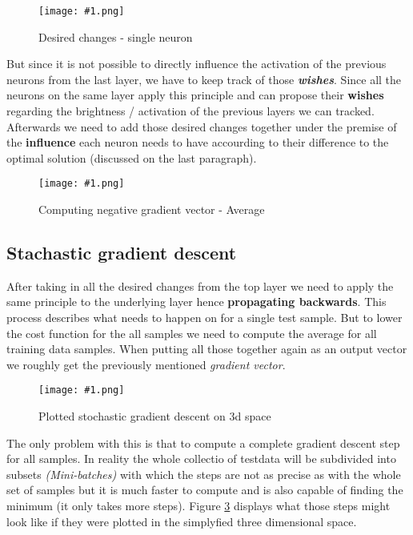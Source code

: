\documentclass{article}
\newcommand{\img}[1]{
	\centering
	\texttt{[image: \#1.png]}
	\label{#1}
}
\begin{document}
\begin{figure}[!htbp]
\img{ai_21}
\caption{Desired changes - single neuron}
\end{figure}

But since it is not possible to directly influence the activation of the previous neurons from the last layer, we have to keep track of those \textbf{\textit{wishes}}. Since all the neurons on the same layer apply this principle and can propose their \textbf{wishes} regarding the brightness / activation of the previous layers we can tracked. Afterwards we need to add those desired changes together under the premise of the \textbf{influence} each neuron needs to have accourding to their difference to the optimal solution (discussed on the last paragraph). 

\begin{figure}[H]
\img{ai_22}
\caption{Computing negative gradient vector - Average}
\end{figure}



\subsection{Stachastic gradient descent}

After taking in all the desired changes from the top layer we need to apply the same principle to the underlying layer hence \textbf{propagating backwards}. This process describes what needs to happen on for a single test sample. But to lower the cost function for the all samples we need to compute the average for all training data samples. When putting all those together again as an output vector we roughly get the previously mentioned \textit{gradient vector}.

\begin{figure}[!htbp]
\img{ai_23}
\caption{Plotted stochastic gradient descent on 3d space}
\end{figure}

The only problem with this is that to compute a complete gradient descent step for all samples. In reality the whole collectio of testdata will be subdivided into subsets \textit{(Mini-batches)} with which the steps are not as precise as with the whole set of samples but it is much faster to compute and is also capable of finding the minimum (it only takes more steps). Figure \ref{ai_23} displays what those steps might look like if they were plotted in the simplyfied three dimensional space.
\end{document}
